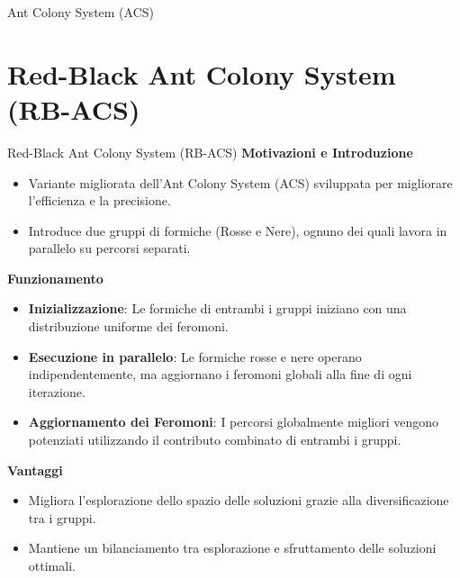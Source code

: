 \documentclass{beamer}
\begin{document}
\begin{frame}{Ant Colony System (ACS)}
\end{frame}


\section{Red-Black Ant Colony System (RB-ACS)}
\begin{frame}{Red-Black Ant Colony System (RB-ACS)}
    \textbf{Motivazioni e Introduzione}
    \begin{itemize}
        \item Variante migliorata dell'Ant Colony System (ACS) sviluppata per migliorare l’efficienza e la precisione.
        \item Introduce due gruppi di formiche (Rosse e Nere), ognuno dei quali lavora in parallelo su percorsi separati.
    \end{itemize}

    \textbf{Funzionamento}
    \begin{itemize}
        \item \textbf{Inizializzazione}: Le formiche di entrambi i gruppi iniziano con una distribuzione uniforme dei feromoni.
        \item \textbf{Esecuzione in parallelo}: Le formiche rosse e nere operano indipendentemente, ma aggiornano i feromoni globali alla fine di ogni iterazione.
        \item \textbf{Aggiornamento dei Feromoni}: I percorsi globalmente migliori vengono potenziati utilizzando il contributo combinato di entrambi i gruppi.
    \end{itemize}

    \textbf{Vantaggi}
    \begin{itemize}
        \item Migliora l'esplorazione dello spazio delle soluzioni grazie alla diversificazione tra i gruppi.
        \item Mantiene un bilanciamento tra esplorazione e sfruttamento delle soluzioni ottimali.
    \end{itemize}


\end{frame}
\end{document}
